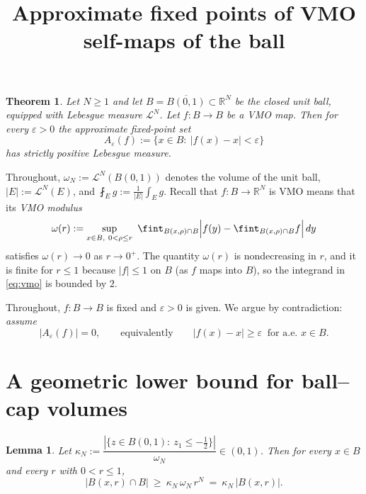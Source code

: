 \documentclass{amsart}
\newtheorem{theorem}{Theorem}
\newtheorem{lemma}{Lemma}
\theoremstyle{definition}
\begin{document}
\title{Approximate fixed points of VMO self-maps of the ball}
\maketitle

\begin{theorem}
Let $N\ge 1$ and let $B=\overline{B(0,1)}\subset\mathbb{R}^N$ be the closed unit
ball, equipped with Lebesgue measure $\mathcal{L}^N$. Let $f:B\to B$ be a VMO map.
Then for every $\varepsilon>0$ the approximate fixed-point set
\[
A_\varepsilon(f):=\{x\in B:\ |f(x)-x|<\varepsilon\}
\]
has strictly positive Lebesgue measure.
\end{theorem}

Throughout, $\omega_N:=\mathcal{L}^N(B(0,1))$ denotes the volume of the unit ball,
$|E|:=\mathcal{L}^N(E)$, and $\fint_E g:=\frac1{|E|}\int_E g$. Recall that
$f:B\to\mathbb{R}^N$ is VMO means that its \emph{VMO modulus}
\begin{equation}\label{eq:vmo}
\omega(r):=\sup_{\substack{x\in B,\ 0<\rho\le r}}
\ \fint_{B(x,\rho)\cap B}\Bigl|f(y)-\fint_{B(x,\rho)\cap B} f\Bigr|\,dy
\end{equation}
satisfies $\omega(r)\to 0$ as $r\to0^+$. The quantity $\omega(r)$ is nondecreasing
in $r$, and it is finite for $r\le 1$ because $|f|\le 1$ on $B$ (as $f$ maps into
$B$), so the integrand in \eqref{eq:vmo} is bounded by $2$.

Throughout, $f:B\to B$ is fixed and $\varepsilon>0$ is given. We argue by
contradiction: \emph{assume}
\begin{equation}\label{eq:assume}
|A_\varepsilon(f)|=0,\qquad\text{equivalently}\qquad
|f(x)-x|\ge\varepsilon\ \text{ for a.e.\ } x\in B.
\end{equation}

\section{A geometric lower bound for ball--cap volumes}

\begin{lemma}\label{lem:cap}
Let $\kappa_N:=\dfrac{|\{z\in B(0,1):\ z_1\le -\tfrac12\}|}{\omega_N}\in(0,1)$.
Then for every $x\in B$ and every $r$ with $0<r\le 1$,
\[
|B(x,r)\cap B|\ \ge\ \kappa_N\,\omega_N\,r^N\ =\ \kappa_N\,|B(x,r)|.
\]
\end{lemma}
\end{document}
